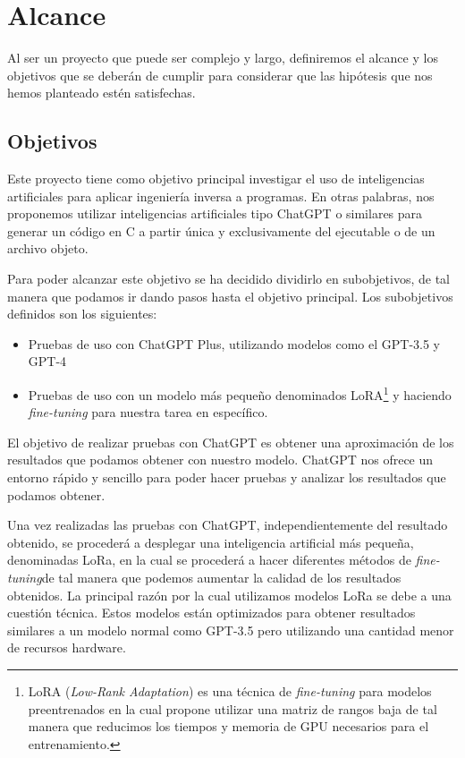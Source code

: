 \chapter{Alcance}
\label{cap:alcance}


Al ser un proyecto que puede ser complejo y largo, definiremos el alcance y los objetivos que se deberán de cumplir para considerar que las hipótesis que nos
hemos planteado estén satisfechas.

\section{Objetivos}
\label{sec:objetivos}


Este proyecto tiene como objetivo principal investigar el uso de inteligencias artificiales para aplicar ingeniería inversa a programas.
En otras palabras, nos proponemos utilizar inteligencias artificiales tipo ChatGPT o similares para generar un código en C a partir única
y exclusivamente del ejecutable o de un archivo objeto.

Para poder alcanzar este objetivo se ha decidido dividirlo en subobjetivos, de tal manera que podamos ir dando pasos hasta el objetivo principal.
Los subobjetivos definidos son los siguientes:

\begin{itemize}
    \item Pruebas de uso con ChatGPT Plus, utilizando modelos como el GPT-3.5 y GPT-4
    \item Pruebas de uso con un modelo más pequeño denominados LoRA\footnote{LoRA (\textit{Low-Rank Adaptation}) es una técnica de \textit{fine-tuning} para modelos
        preentrenados en la cual propone utilizar una matriz de rangos baja de tal manera que reducimos los tiempos y memoria de GPU necesarios para el entrenamiento.}
        y haciendo \textit{fine-tuning} para nuestra tarea en específico.
\end{itemize}

El objetivo de realizar pruebas con ChatGPT es obtener una aproximación de los resultados que podamos obtener con nuestro modelo. ChatGPT nos
ofrece un entorno rápido y sencillo para poder hacer pruebas y analizar los resultados que podamos obtener.

Una vez realizadas las pruebas con ChatGPT, independientemente del resultado obtenido, se procederá a desplegar una inteligencia artificial más pequeña,
denominadas LoRa, en la cual se procederá a hacer diferentes métodos de \textit{fine-tuning}de tal manera que podemos aumentar la calidad de los resultados
obtenidos. La principal razón por la cual utilizamos modelos LoRa se debe a una cuestión técnica. Estos modelos están optimizados para obtener resultados
similares a un modelo normal como GPT-3.5 pero utilizando una cantidad menor de recursos hardware.

